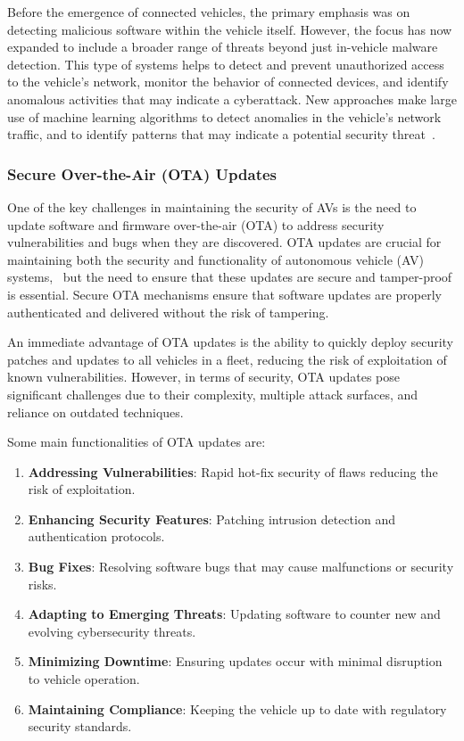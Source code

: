 Before the emergence of connected vehicles, the primary emphasis was on detecting malicious software within the vehicle itself.
However, the focus has now expanded to include a broader range of threats beyond just in-vehicle malware detection.
This type of systems helps to detect and prevent unauthorized access to the vehicle's network, monitor the behavior of connected devices, and identify anomalous activities that may indicate a cyberattack.
New approaches make large use of machine learning algorithms to detect anomalies in the vehicle's network traffic, and to identify patterns that may indicate a potential security threat~\cite{nagarajan2023machine}.

\subsubsection{Secure Over-the-Air (OTA) Updates}\label{subsubsec:secure-over-the-air-ota-updates}

One of the key challenges in maintaining the security of AVs is the need to update software and firmware over-the-air (OTA) to address security vulnerabilities and bugs when they are discovered.
OTA updates are crucial for maintaining both the security and functionality of autonomous vehicle (AV) systems,~\cite{durlik2022cybersecurity, ahangar2021survey} but the need to ensure that these updates are secure and tamper-proof is essential.
Secure OTA mechanisms ensure that software updates are properly authenticated and delivered without the risk of tampering.

An immediate advantage of OTA updates is the ability to quickly deploy security patches and updates to all vehicles in a fleet, reducing the risk of exploitation of known vulnerabilities.
However, in terms of security, OTA updates pose significant challenges due to their complexity, multiple attack surfaces, and reliance on outdated techniques.

Some main functionalities of OTA updates are:
\begin{enumerate}
    \item \textbf{Addressing Vulnerabilities}: Rapid hot-fix security of flaws reducing the risk of exploitation.
    \item \textbf{Enhancing Security Features}: Patching intrusion detection and authentication protocols.
    \item \textbf{Bug Fixes}: Resolving software bugs that may cause malfunctions or security risks.
    \item \textbf{Adapting to Emerging Threats}: Updating software to counter new and evolving cybersecurity threats.
    \item \textbf{Minimizing Downtime}: Ensuring updates occur with minimal disruption to vehicle operation.
    \item \textbf{Maintaining Compliance}: Keeping the vehicle up to date with regulatory security standards.
\end{enumerate}

